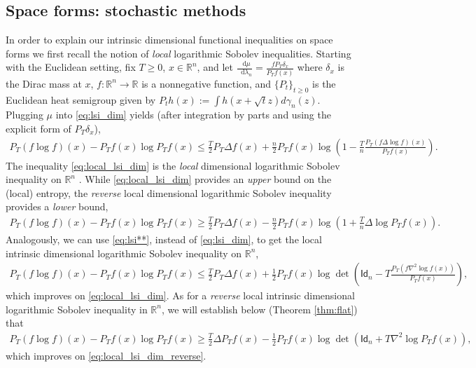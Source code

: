 \documentclass[a4paper,twoside,11pt,reqno]{amsart}
\newcommand*\diff{\mathop{}\!\mathrm{d}}
\newcommand{\R}{\mathbb{R}} %
\newcommand{\msf}{\mathsf}
\begin{document}

\subsection{Space forms: stochastic methods} \label{sec:intro_space} In order to explain our intrinsic dimensional functional inequalities on space forms we first recall the notion of \emph{local} logarithmic Sobolev inequalities. Starting with the Euclidean setting, fix $T\ge 0$, $x\in \R^n$, and let $\frac{\diff\mu}{\diff \lambda_n}=\frac{fP_T\delta_x}{P_Tf(x)}$ where $\delta_x$ is the Dirac mass at $x$, $f:\R^n\to \R$ is a nonnegative function, and $\{P_t\}_{t\geq0}$ is the Euclidean heat semigroup given by $P_th(x):=\int h(x+\sqrt{t}z)d\gamma_n(z)$. Plugging $\mu$ into \eqref{eq:lsi_dim} yields (after integration by parts and using the explicit form of $P_T\delta_x$),
\begin{align}
\label{eq:local_lsi_dim}
P_T(f\log f)(x)-P_Tf(x)\log P_Tf(x)\le \frac{T}{2}P_T\Delta f (x)+\frac{n}{2}P_Tf(x)\log\left(1-\frac{T}{n}\frac{P_T(f\Delta\log f)(x)}{P_Tf(x)}\right).
\end{align}
The inequality \eqref{eq:local_lsi_dim} is the \emph{local} dimensional logarithmic Sobolev inequality on $\R^n$ \cite{BL06}. While \eqref{eq:local_lsi_dim} provides an \emph{upper} bound on the (local) entropy, the  \emph{reverse} local dimensional logarithmic Sobolev inequality \cite{BL06} provides a \emph{lower} bound,
\begin{align}
\label{eq:local_lsi_dim_reverse}
P_T(f\log f)(x)-P_Tf(x)\log P_Tf(x)\ge \frac{T}{2}P_T\Delta f (x)-\frac{n}{2}P_Tf(x)\log\left(1+\frac{T}{n}\Delta\log P_Tf(x)\right).
\end{align}
Analogously, we can use \eqref{eq:lsi**}, instead of \eqref{eq:lsi_dim}, to get the local intrinsic dimensional logarithmic Sobolev inequality on $\R^n$,
\begin{align}
\label{eq:intrinisc_lsi_dim}
P_T(f\log f)(x)-P_Tf(x)\log P_Tf(x)\le \frac{T}{2}P_T \Delta f (x)+\frac{1}{2}P_Tf(x)\log\det\left(\msf{Id}_n -T\frac{P_T(f\nabla^2\log f(x))}{P_Tf(x)}\right),
\end{align}
which improves on \eqref{eq:local_lsi_dim}. As for a \emph{reverse}  local intrinsic dimensional logarithmic Sobolev inequality in $\R^n$, we will establish below (Theorem \ref{thm:flat}) that
\begin{align}
\label{eq:intrinisc_lsi_dim_reverse}
P_T(f\log f)(x)-P_Tf(x)\log P_Tf(x)\ge \frac{T}{2}\Delta P_Tf(x)-\frac{1}{2}P_Tf(x)\log\det\left(\msf{Id}_n+T\nabla^2\log P_Tf(x)\right),
\end{align}
which improves on \eqref{eq:local_lsi_dim_reverse}.
\end{document}
